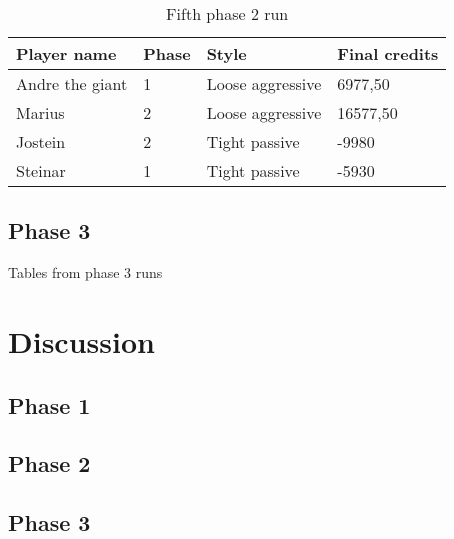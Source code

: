 \documentclass[a4paper, 12pt]{article}
\begin{document}
\begin{table}[H]
	\begin{center}
		\begin{tabular}{|l|l|l| p{6cm} |}
		\hline
		\textbf{Player name} & \textbf{Phase} & \textbf{Style} & \textbf{Final credits} \\
		\hline
		Andre the giant & 1 & Loose aggressive & 6977,50 \\
		\hline
		Marius & 2 & Loose aggressive & 16577,50 \\
		\hline
		Jostein & 2 & Tight passive & -9980 \\
		\hline
		Steinar & 1 & Tight passive & -5930 \\
		\hline
		\end{tabular}
	\end{center}
	\caption{Fifth phase 2 run}
\end{table}

\subsection{Phase 3}
Tables from phase 3 runs

\section{Discussion}

\subsection{Phase 1}

\subsection{Phase 2}

\subsection{Phase 3}
\end{document}
